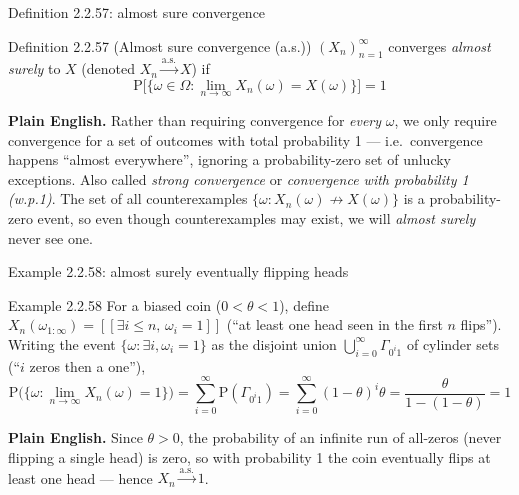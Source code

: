 \documentclass[aspectratio=169,10pt]{beamer}
\begin{document}
\begin{frame}{Definition 2.2.57: almost sure convergence}
\begin{block}{Definition 2.2.57 (Almost sure convergence (a.s.))}
$(X_n)_{n=1}^{\infty}$ converges \emph{almost surely} to $X$ (denoted
$X_n\xrightarrow{\text{a.s.}}X$) if
\[ \mathrm{P}\big[\{\omega\in\Omega : \lim_{n\to\infty}X_n(\omega)=X(\omega)\}\big] = 1 \]
\end{block}
\textbf{Plain English.} Rather than requiring convergence for \emph{every}
$\omega$, we only require convergence for a set of outcomes with total
probability 1 --- i.e.\ convergence happens ``almost everywhere'', ignoring a
probability-zero set of unlucky exceptions. Also called \emph{strong
convergence} or \emph{convergence with probability 1 (w.p.1)}. The set of
all counterexamples $\{\omega : X_n(\omega)\not\to X(\omega)\}$ is a
probability-zero event, so even though counterexamples may exist, we will
\emph{almost surely} never see one.
\end{frame}

\begin{frame}{Example 2.2.58: almost surely eventually flipping heads}
\begin{block}{Example 2.2.58}
For a biased coin ($0<\theta<1$), define $X_n(\omega_{1:\infty}) = [\![\exists i\leq n,\,\omega_i=1]\!]$
(``at least one head seen in the first $n$ flips''). Writing the event
$\{\omega:\exists i, \omega_i=1\}$ as the disjoint union
$\bigcup_{i=0}^{\infty}\Gamma_{0^i1}$ of cylinder sets (``$i$ zeros then a
one''),
\[ \mathrm{P}\big(\{\omega: \lim_{n\to\infty}X_n(\omega)=1\}\big) = \sum_{i=0}^{\infty}\mathrm{P}(\Gamma_{0^i1}) = \sum_{i=0}^{\infty}(1-\theta)^i\theta = \frac{\theta}{1-(1-\theta)} = 1 \]
\end{block}
\textbf{Plain English.} Since $\theta>0$, the probability of an infinite run
of all-zeros (never flipping a single head) is zero, so with probability 1
the coin eventually flips at least one head --- hence $X_n\xrightarrow{\text{a.s.}}1$.
\end{frame}
\end{document}
